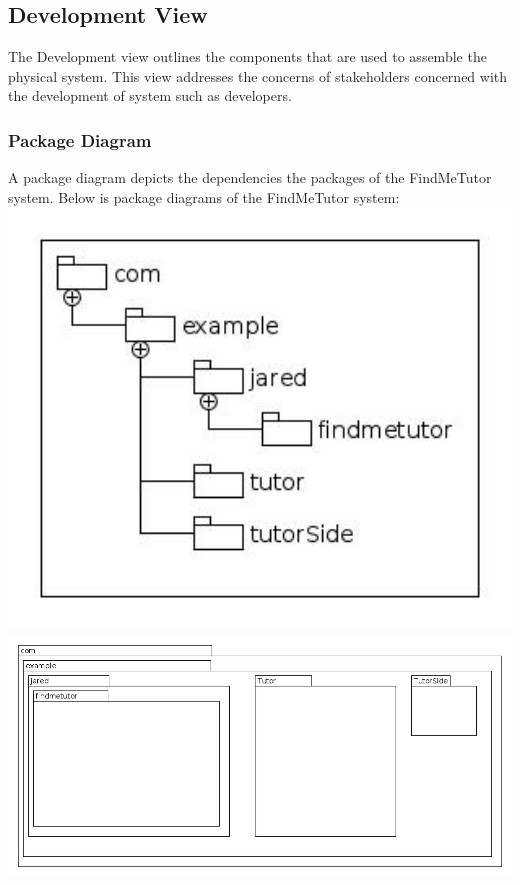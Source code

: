 \documentclass[12pt]{article}
\begin{document}
\subsection{Development View}
The Development view outlines the components that are used to assemble the physical system.
This view addresses the concerns of stakeholders concerned with the development of system such as developers.\\
\subsubsection{Package Diagram}

A package diagram depicts the dependencies the packages of the FindMeTutor system.
Below is package diagrams of the FindMeTutor system:\\
\includegraphics[width=140mm]{./Pakage.jpg}
\includegraphics[width=140mm]{./Pakage2.jpg}
\end{document}
